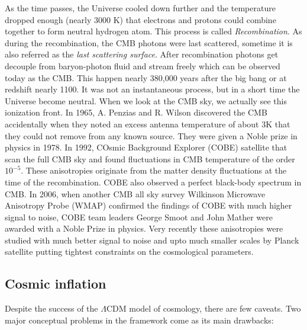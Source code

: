 As the time passes, the Universe cooled down further and the temperature
dropped enough (nearly 3000 K) that electrons and protons could combine 
together to form neutral hydrogen
atom. This process is called {\it Recombination}. As during the recombination,
the CMB photons were last scattered, sometime it is also referred
as the {\it last scattering surface}. After recombination photons 
get decouple from baryon-photon fluid and stream freely which
can be observed today as the CMB. 
This happen nearly 380,000 years after the big bang or at redshift nearly
1100. It was not an instantaneous process, but in a short time
the Universe become neutral. When we look at the CMB sky, we actually see
this ionization front. In 1965, A. Penzias and R. Wilson discovered the CMB
accidentally when they noted an excess antenna temperature of about 3K that
they could not remove from any known source. They were given a Noble prize in 
physics in 1978. In 1992, COsmic Background Explorer (COBE) satellite that
scan the full CMB sky and found fluctuations in CMB temperature of the 
order $10^{-5}$. These anisotropies originate from the matter density
fluctuations at the time of the recombination. COBE also observed a perfect
black-body spectrum in CMB. In 2006, when another CMB all sky survey 
Wilkinson Microwave Anisotropy Probe (WMAP) confirmed the findings of COBE
with much higher signal to noise, COBE team leaders George Smoot and John Mather
were awarded with a Noble Prize in physics. Very recently these anisotropies were studied
with much better signal to noise and upto much smaller scales by Planck satellite
putting tightest constraints on the cosmological parameters.


\subsection{Cosmic inflation}

Despite the success of the $\Lambda$CDM model of cosmology, there are few caveats.
Two major conceptual problems in the framework come as its main drawbacks:


